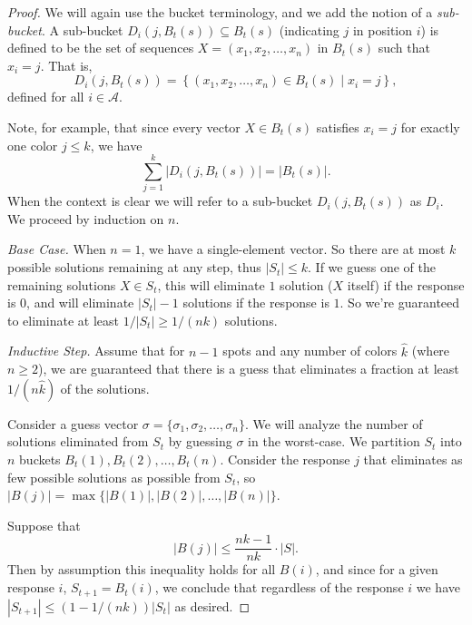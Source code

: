 \documentclass[12pt, a4paper]{article}
\begin{document}
\begin{proof}
	We will again use the bucket terminology, and we add the notion of a \textit{sub-bucket}. A sub-bucket $D_i(j, B_t(s))\subseteq B_t(s)$ (indicating $j$ in position $i$) is defined to be the set of sequences $X = (x_1, x_2, \ldots, x_n)$ in $B_t(s)$ such that $x_i = j$. That is,
	\begin{equation*}
		D_i(j, B_t(s)) = \left\{(x_1, x_2, \ldots, x_n)\in B_t(s)\mid x_i = j\right\},
	\end{equation*}
	defined for all $i\in\mathcal{A}$. 
	
	Note, for example, that since every vector $X \in B_t(s)$ satisfies $x_i = j$ for exactly one color $j \leq k$, we have
	\begin{equation}\label{color-buck}
	\sum_{j = 1}^k |D_i(j,B_t(s))| = |B_t(s)|.
	\end{equation}
	When the context is clear we will refer to a sub-bucket $D_i(j, B_t(s))$ as $D_i$.
	We proceed by induction on $n$.
	
	\textit{Base Case.} When $n=1$, we have a single-element vector. So there are at most $k$ possible solutions remaining at any step, thus $|S_t|\le k$. If we guess one of the remaining solutions $X\in S_t$, this will eliminate $1$ solution ($X$ itself) if the response is $0$, and will eliminate $|S_t|-1$ solutions if the response is $1$. So we're guaranteed to eliminate at least $1/|S_t|\ge 1/(nk)$ solutions.
		
	\textit{Inductive Step.} Assume that for $n-1$ spots and any number of colors $\widehat{k}$ (where $n\ge 2$), we are guaranteed that there is a guess that eliminates a fraction at least $1/(n\widehat{k})$ of the solutions.
		
	Consider a guess vector $\sigma=\{\sigma_1, \sigma_2, \ldots, \sigma_n\}$. We will analyze the number of solutions eliminated from $S_t$ by guessing $\sigma$ in the worst-case. We partition $S_t$ into $n$ buckets $B_t(1), B_t(2), \ldots, B_t(n)$. Consider the response $j$ that eliminates as few possible solutions as possible from $S_t$, so $|B(j)| = \max\{|B(1)|, |B(2)|, \ldots, |B(n)|\}$. 
	
	Suppose that
	\begin{equation*}
	|B(j)|\le\frac{nk - 1}{nk}\cdot|S|.
	\end{equation*}
	Then by assumption this inequality holds for all $B(i)$, and since for a given response $i$, $S_{t+1} = B_t(i)$, we conclude that regardless of the response $i$ we have $|S_{t+1}| \leq (1-1/(nk))|S_t|$ as desired.
	

\end{proof}
\end{document}
